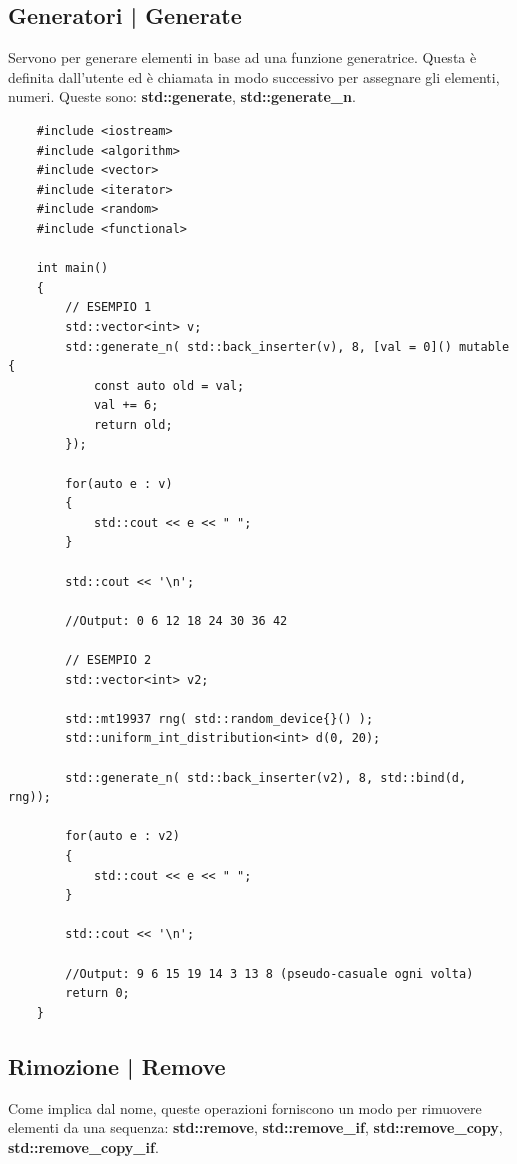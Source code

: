 \subsection{Generatori | Generate}

\textsf{\small Servono per generare elementi in base ad una funzione generatrice. Questa è definita dall'utente ed è chiamata in modo successivo per assegnare gli elementi, numeri. Queste sono: \textbf{std::generate}, \textbf{std::generate\_n}. } \\

\begin{lstlisting}
	#include <iostream>
	#include <algorithm>
	#include <vector>
	#include <iterator>
	#include <random>
	#include <functional>
	
	int main()
	{
		// ESEMPIO 1
		std::vector<int> v;
		std::generate_n( std::back_inserter(v), 8, [val = 0]() mutable {
			const auto old = val;
			val += 6;
			return old;
		});
	
		for(auto e : v)
		{
			std::cout << e << " ";
		}
		
		std::cout << '\n';
	
		//Output: 0 6 12 18 24 30 36 42
	
		// ESEMPIO 2
		std::vector<int> v2;
		
		std::mt19937 rng( std::random_device{}() );
		std::uniform_int_distribution<int> d(0, 20);
		
		std::generate_n( std::back_inserter(v2), 8, std::bind(d, rng));
		
		for(auto e : v2)
		{
			std::cout << e << " ";
		}
		
		std::cout << '\n';
		
		//Output: 9 6 15 19 14 3 13 8 (pseudo-casuale ogni volta)
		return 0;
	}
\end{lstlisting}


\subsection{Rimozione | Remove}

\textsf{\small Come implica dal nome, queste operazioni forniscono un modo per rimuovere elementi da una sequenza: \textbf{std::remove}, \textbf{std::remove\_if}, \textbf{std::remove\_copy}, \textbf{std::remove\_copy\_if}.} \\

